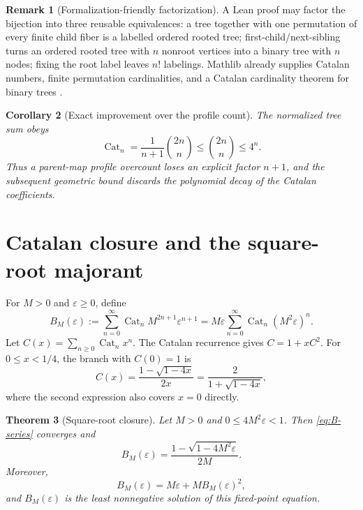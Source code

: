 \documentclass[11pt,a4paper]{article}
\newtheorem{theorem}{Theorem}[section]
\newtheorem{corollary}[theorem]{Corollary}
\theoremstyle{definition}
\newtheorem{remark}[theorem]{Remark}
\newcommand{\Cat}{\operatorname{Cat}}
\newcommand{\eps}{\varepsilon}
\begin{document}
\begin{remark}[Formalization-friendly factorization]
A Lean proof may factor the bijection into three reusable equivalences: a tree together
with one permutation of every finite child fiber is a labelled ordered rooted tree;
first-child/next-sibling turns an ordered rooted tree with $n$ nonroot vertices into a
binary tree with $n$ nodes; fixing the root label leaves $n!$ labelings.  Mathlib already
supplies Catalan numbers, finite permutation cardinalities, and a Catalan cardinality
theorem for binary trees \cite{MathlibCatalan}.
\end{remark}

\begin{corollary}[Exact improvement over the profile count]
\label{cor:central-binomial}
The normalized tree sum obeys
\[
 \Cat_n=\frac{1}{n+1}\binom{2n}{n}
 \le\binom{2n}{n}\le4^n.
\]
Thus a parent-map profile overcount loses an explicit factor $n+1$, and the subsequent
geometric bound discards the polynomial decay of the Catalan coefficients.
\end{corollary}

\section{Catalan closure and the square-root majorant}
\label{sec:closure}

For $M>0$ and $\eps\ge0$, define
\begin{equation}
  B_M(\eps)
  :=\sum_{n=0}^{\infty}\Cat_n M^{2n+1}\eps^{n+1}
  =M\eps\sum_{n=0}^{\infty}\Cat_n(M^2\eps)^n.
  \label{eq:B-series}
\end{equation}
Let $C(x)=\sum_{n\ge0}\Cat_nx^n$.  The Catalan recurrence gives $C=1+xC^2$.  For
$0\le x<1/4$, the branch with $C(0)=1$ is
\begin{equation}
  C(x)=\frac{1-\sqrt{1-4x}}{2x}
      =\frac{2}{1+\sqrt{1-4x}},
  \label{eq:C-closed}
\end{equation}
where the second expression also covers $x=0$ directly.

\begin{theorem}[Square-root closure]
\label{thm:square-root}
Let $M>0$ and $0\le4M^2\eps<1$.  Then \eqref{eq:B-series} converges and
\begin{equation}
 \boxed{
  B_M(\eps)=\frac{1-\sqrt{1-4M^2\eps}}{2M}.}
 \label{eq:B-closed}
\end{equation}
Moreover,
\begin{equation}
  B_M(\eps)=M\eps+M B_M(\eps)^2,
  \label{eq:B-fixed-point}
\end{equation}
and $B_M(\eps)$ is the least nonnegative solution of this fixed-point equation.
\end{theorem}
\end{document}
